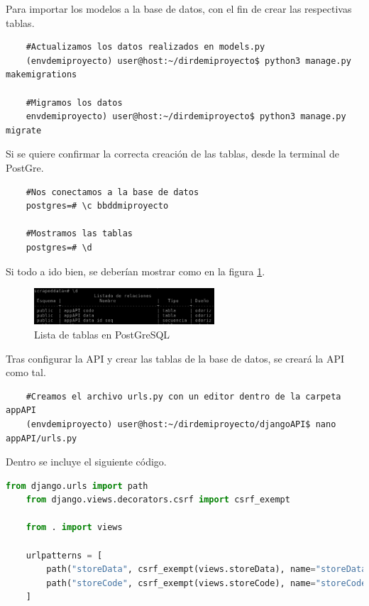Para importar los modelos a la base de datos, con el fin de crear las respectivas tablas.

\begin{lstlisting}
	#Actualizamos los datos realizados en models.py
	(envdemiproyecto) user@host:~/dirdemiproyecto$ python3 manage.py makemigrations
	
	#Migramos los datos
	envdemiproyecto) user@host:~/dirdemiproyecto$ python3 manage.py migrate
\end{lstlisting}

Si se quiere confirmar la correcta creación de las tablas, desde la terminal de PostGre.

\begin{lstlisting}
	#Nos conectamos a la base de datos
	postgres=# \c bbddmiproyecto
	
	#Mostramos las tablas
	postgres=# \d
\end{lstlisting}

Si todo a ido bien, se deberían mostrar como en la figura \ref{fig:ej34}.

\begin{figure} [H]
	\centering
	\includegraphics[width=0.6\textwidth]{fig/comprobacionTablasBBDD.png}
	\caption[Lista de tablas en PostGreSQL]{Lista de tablas en PostGreSQL}
	\label{fig:ej34}
\end{figure}

Tras configurar la API y crear las tablas de la base de datos, se creará la API como tal.

\begin{lstlisting}
	#Creamos el archivo urls.py con un editor dentro de la carpeta appAPI
	(envdemiproyecto) user@host:~/dirdemiproyecto/djangoAPI$ nano appAPI/urls.py
\end{lstlisting}

Dentro se incluye el siguiente código.

\begin{lstlisting}[language=Python, caption={Definición URLs API}]
	from django.urls import path
	from django.views.decorators.csrf import csrf_exempt
	
	from . import views

	urlpatterns = [
		path("storeData", csrf_exempt(views.storeData), name="storeData"),
		path("storeCode", csrf_exempt(views.storeCode), name="storeCode"),
	]
\end{lstlisting}

